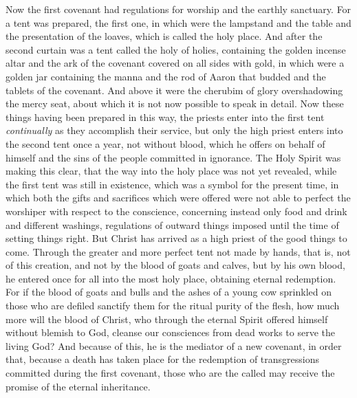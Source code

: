 \begin{biblechapter} %
 Now the first covenant had regulations for worship and the earthly sanctuary.
\verse For a tent was prepared, the first one, in which were the lampstand and the table and the presentation of the loaves, which is called the holy place.
\verse And after the second curtain was a tent called the holy of holies,
\verse containing the golden incense altar and the ark of the covenant covered on all sides with gold, in which were a golden jar containing the manna and the rod of Aaron that budded and the tablets of the covenant.
\verse And above it were the cherubim of glory overshadowing the mercy seat, about which it is not now possible to speak in detail.
\verse Now these things having been prepared in this way, the priests enter into the first tent \textit{continually} as they accomplish their service,
\verse but only the high priest enters into the second tent once a year, not without blood, which he offers on behalf of himself and the sins of the people committed in ignorance.
\verse The Holy Spirit was making this clear, that the way into the holy place was not yet revealed, while the first tent was still in existence,
\verse which was a symbol for the present time, in which both the gifts and sacrifices which were offered were not able to perfect the worshiper with respect to the conscience,
\verse concerning instead only food and drink and different washings, regulations of outward things imposed until the time of setting things right.
 But Christ has arrived as a high priest of the good things to come. Through the greater and more perfect tent not made by hands, that is, not of this creation,
\verse and not by the blood of goats and calves, but by his own blood, he entered once for all into the most holy place, obtaining eternal redemption.
\verse For if the blood of goats and bulls and the ashes of a young cow sprinkled on those who are defiled sanctify them for the ritual purity of the flesh,
\verse how much more will the blood of Christ, who through the eternal Spirit offered himself without blemish to God, cleanse our consciences from dead works to serve the living God?
\verse And because of this, he is the mediator of a new covenant, in order that, because a death has taken place for the redemption of transgressions committed during the first covenant, those who are the called may receive the promise of the eternal inheritance.

\end{biblechapter}
